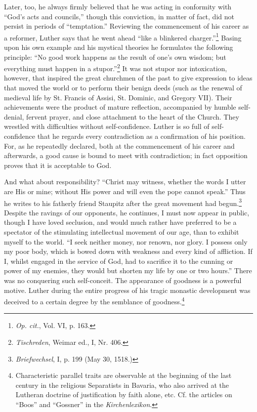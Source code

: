 Later, too, he always firmly believed that he was acting in conformity
with “God’s acts and councils,” though this conviction,
in matter of fact, did not persist in periods of “temptation.”
Reviewing the commencement of his career as a reformer, Luther
says that he went ahead “like a blinkered charger.”\footnote{\textit{Op. cit.}, Vol. VI, p. 163.}
Basing upon
his own example and his mystical theories he formulates the following
principle: “No good work happens as the result of one’s own wisdom;
but everything must happen in a stupor.”\footnote{\textit{Tischreden}, Weimar ed., I, Nr. 406.}
It was not stupor nor
intoxication, however, that inspired the great churchmen of the
past to give expression to ideas that moved the world or to perform
their benign deeds (such as the renewal of medieval life by St.
Francis of Assisi, St. Dominic, and Gregory VII). Their achievements
were the product of mature reflection, accompanied by humble
self-denial, fervent prayer, and close attachment to the heart of the
Church. They wrestled with difficulties without self-confidence.
Luther is so full of self-confidence that he regards every contradiction
as a confirmation of his position. For, as he repeatedly declared,
both at the commencement of his career and afterwards, a good
cause is bound to meet with contradiction; in fact opposition proves
that it is acceptable to God.

And what about responsibility? “Christ may witness, whether
the words I utter are His or mine; without His power and will
even the pope cannot speak.” Thus he writes to his fatherly friend
Staupitz after the great movement had begun.\footnote
{\textit{Briefwechsel}, I, p. 199 (May 30, 1518.)}
Despite the ravings
of our opponents, he continues, I must now appear in public, though
I have loved seclusion, and would much rather have preferred to be
a spectator of the stimulating intellectual movement of our age, than
to exhibit myself to the world. “I seek neither money, nor renown,
nor glory. I possess only my poor body, which is bowed down with
weakness and every kind of affliction. If I, whilst engaged in the
service of God, had to sacrifice it to the cunning or power of my
enemies, they would but shorten my life by one or two hours.” There
was no conquering such self-conceit. The appearance of goodness is
a powerful motive. Luther during the entire progress of his tragic
monastic development was deceived to a certain degree by the semblance
of goodness.\footnote{Characteristic parallel traits are observable at the beginning of the last century in
the religious Separatists in Bavaria, who also arrived at the Lutheran doctrine of justification
by faith alone, etc. Cf. the articles on “Boos” and “Gossner” in the \textit{Kirchenlexikon}.
}

